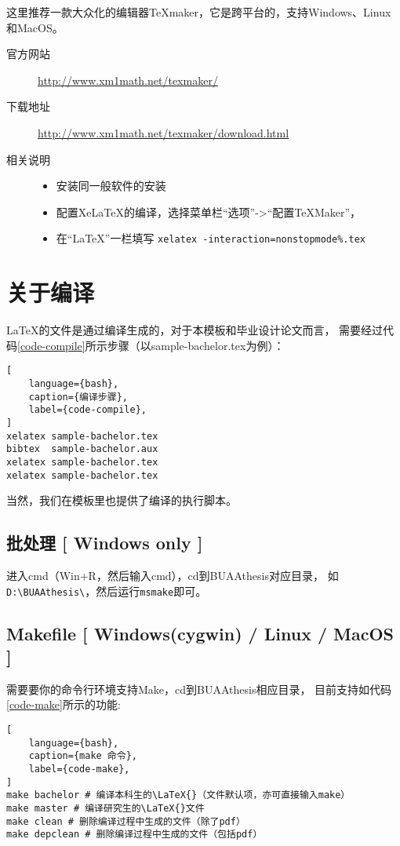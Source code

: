 这里推荐一款大众化的编辑器\TeX{}maker，它是跨平台的，支持Windows、Linux和MacOS。

\begin{description}
    \item[官方网站]
        \url{http://www.xm1math.net/texmaker/}
    \item[下载地址]
        \url{http://www.xm1math.net/texmaker/download.html}
    \item[相关说明]
    \begin{itemize}
        \item 安装同一般软件的安装
        \item 配置Xe\LaTeX{}的编译，选择菜单栏“选项”->“配置\TeX{}Maker”，
        \item[] 在“\LaTeX{}”一栏填写
            \texttt{xelatex -interaction=nonstopmode\%.tex}
    \end{itemize}
\end{description}

\section{关于编译}

\LaTeX{}的文件是通过编译生成的，对于本模板和毕业设计论文而言，
需要经过代码\ref{code-compile}所示步骤（以sample-bachelor.tex为例）：
\begin{lstlisting}[
    language={bash},
    caption={编译步骤},
    label={code-compile},
]
xelatex sample-bachelor.tex
bibtex  sample-bachelor.aux
xelatex sample-bachelor.tex
xelatex sample-bachelor.tex
\end{lstlisting}
当然，我们在模板里也提供了编译的执行脚本。

\subsection{批处理 [ Windows only ]}

进入cmd（Win+R，然后输入cmd），cd到BUAAthesis对应目录，
如\verb|D:\BUAAthesis\|，然后运行\verb|msmake|即可。

\subsection{Makefile [ Windows(cygwin) / Linux / MacOS ]}
需要要你的命令行环境支持Make，cd到BUAAthesis相应目录，
目前支持如代码\ref{code-make}所示的功能:
\begin{lstlisting}[
    language={bash},
    caption={make 命令},
    label={code-make},
]
make bachelor # 编译本科生的\LaTeX{}（文件默认项，亦可直接输入make）
make master # 编译研究生的\LaTeX{}文件
make clean # 删除编译过程中生成的文件（除了pdf）
make depclean # 删除编译过程中生成的文件（包括pdf）
\end{lstlisting}
